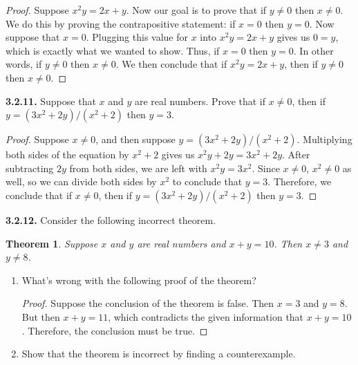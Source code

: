 \documentclass[12pt]{amsart}
\newenvironment{statement}[1]{\smallskip\noindent\color[rgb]{.6627, .3529, .6314} {\bf #1.}}{}
\newtheorem{theorem}{Theorem}
\theoremstyle{definition}
\theoremstyle{remark}
\begin{document}
\begin{proof}
Suppose $x^2y = 2x + y$.
Now our goal is to prove that if $y \neq 0$ then $x \neq 0$.
We do this by proving the contrapositive statement: if $x = 0$ then $y = 0$.
Now suppose that $x = 0$.
Plugging this value for $x$ into $x^2y = 2x + y$ gives us $0 = y$, which is exactly what we wanted to show.
Thus, if $x = 0$ then $y = 0$.
In other words, if $y \neq 0$ then $x \neq 0$.
We then conclude that if $x^2y = 2x + y$, then if $y \neq 0$ then $x \neq 0$.
\end{proof}


\begin{statement}{3.2.11}
Suppose that $x$ and $y$ are real numbers.
Prove that if $x \neq 0$, then if $y = (3x^2 + 2y) / (x^2 + 2)$ then $y = 3$.
\end{statement}

\begin{proof}
Suppose $x \neq 0$, and then suppose $y = (3x^2 + 2y) / (x^2 + 2)$.
Multiplying both sides of the equation by $x^2 + 2$ gives us $x^2y + 2y = 3x^2 + 2y$.
After subtracting $2y$ from both sides, we are left with $x^2y = 3x^2$.
Since $x \neq 0$, $x^2 \neq 0$ as well, so we can divide both sides by $x^2$ to conclude that $y = 3$.
Therefore, we conclude that if $x \neq 0$, then if $y = (3x^2 + 2y) / (x^2 + 2)$ then $y = 3$.
\end{proof}


\begin{statement}{3.2.12}
Consider the following incorrect theorem.
\begin{theorem}
	Suppose $x$ and $y$ are real numbers and $x + y = 10$.
	Then $x \neq 3$ and $y \neq 8$.
\end{theorem}
\begin{enumerate}
	\item What's wrong with the following proof of the theorem?
	\begin{proof}
		Suppose the conclusion of the theorem is false.
		Then $x = 3$ and $y = 8$.
		But then $x + y = 11$, which contradicts the given information that $x + y = 10$.
		Therefore, the conclusion must be true.
	\end{proof}
	
	\item Show that the theorem is incorrect by finding a counterexample.
\end{enumerate}
\end{statement}
\end{document}
